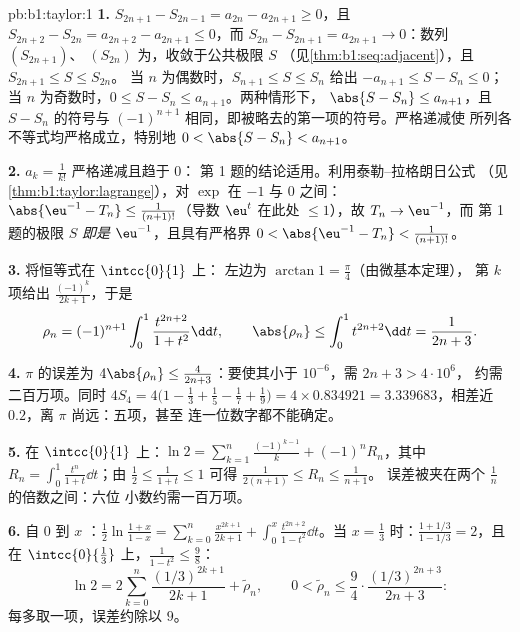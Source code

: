 \begin{solution}{pb:b1:taylor:1}
\textbf{1.} $S_{2n+1} - S_{2n-1} = a_{2n} - a_{2n+1} \geq 0$，且
$S_{2n+2} - S_{2n} = a_{2n+2} - a_{2n+1} \leq 0$，而 $S_{2n}
- S_{2n+1} = a_{2n+1} \to 0$：数列 $(S_{2n+1})$、
$(S_{2n})$ 为，收敛于公共极限 $S$
（见\cref{thm:b1:seq:adjacent}），且 $S_{2n+1} \leq S \leq S_{2n}$。
当 $n$ 为偶数时，$S_{n+1} \leq S \leq S_n$ 给出 $-a_{n+1} \leq S -
S_n \leq 0$；当 $n$ 为奇数时，$0 \leq S - S_n \leq a_{n+1}$。两种情形下，
$\abs{S - S_n} \leq a_{n+1}$，且 $S - S_n$ 的符号与
$(-1)^{n+1}$ 相同，即被略去的第一项的符号。严格递减使
所列各不等式均严格成立，特别地 $0 < \abs{S -
S_n} < a_{n+1}$。

\textbf{2.} $a_k = \frac{1}{k!}$ 严格递减且趋于 $0$：
第 1 题的结论适用。利用泰勒–拉格朗日公式
（见\cref{thm:b1:taylor:lagrange}），对 $\exp$ 在 $-1$ 与 $0$ 之间：
$\abs{\eu^{-1} - T_n} \leq \frac{1}{(n+1)!}$（导数
$\eu^t$ 在此处 $\leq 1$），故 $T_n \to \eu^{-1}$，而
第 1 题的极限 $S$ \emph{即是} $\eu^{-1}$，且具有严格界
$0 < \abs{\eu^{-1} - T_n} < \frac{1}{(n+1)!}$。

\textbf{3.} 将恒等式在 $\intcc{0}{1}$ 上：
左边为 $\arctan 1 = \frac\pi4$（由微基本定理），
第 $k$ 项给出 $\frac{(-1)^k}{2k+1}$，于是
\[
\rho_n = (-1)^{n+1}\int_0^1 \frac{t^{2n+2}}{1+t^2}\dd t,
\qquad
\abs{\rho_n} \leq \int_0^1 t^{2n+2}\dd t = \frac{1}{2n+3} .
\]

\textbf{4.} $\pi$ 的误差为 $4\abs{\rho_n} \leq
\frac{4}{2n+3}$：要使其小于 $10^{-6}$，需 $2n + 3 > 4\cdot10^6$，
约需二百万项。同时 $4S_4 = 4\bigl(1 - \frac13 +
\frac15 - \frac17 + \frac19\bigr) = 4 \times 0.834921 =
3.339683$，相差近 $0.2$，离 $\pi$ 尚远：五项，甚至
连一位数字都不能确定。

\textbf{5.} 在 $\intcc{0}{1}$ 上：$\ln 2 =
\sum_{k=1}^{n} \frac{(-1)^{k-1}}{k} + (-1)^n R_n$，其中 $R_n =
\int_0^1 \frac{t^n}{1+t}\dd t$；由 $\frac12 \leq \frac{1}{1+t}
\leq 1$ 可得 $\frac{1}{2(n+1)} \leq R_n \leq \frac{1}{n+1}$。
误差被夹在两个 $\frac1n$ 的倍数之间：六位
小数约需一百万项。

\textbf{6.} 自 $0$ 到 $x$ ：$\frac12\ln\frac{1 +
x}{1 - x} = \sum_{k=0}^{n} \frac{x^{2k+1}}{2k+1} + \int_0^x
\frac{t^{2n+2}}{1-t^2}\dd t$。当 $x = \frac13$ 时：$\frac{1 +
1/3}{1 - 1/3} = 2$，且在 $\intcc{0}{\frac13}$ 上，$\frac{1}{1 -
t^2} \leq \frac98$：
\[
\ln 2 = 2\sum_{k=0}^{n} \frac{(1/3)^{2k+1}}{2k+1} +
\tilde\rho_n,
\qquad
0 < \tilde\rho_n \leq \frac{9}{4}\cdot
\frac{(1/3)^{2n+3}}{2n+3} :
\]
每多取一项，误差约除以 $9$。


\end{solution}
